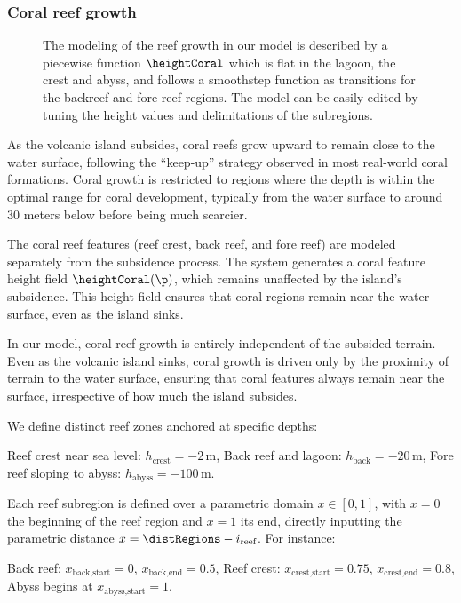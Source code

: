 \subsubsection{Coral reef growth}
\label{sec:coral-island-reef-growth}

\begin{figure}[H]
    \caption{The modeling of the reef growth in our model is described by a piecewise function $\heightCoral$ which is flat in the lagoon, the crest and abyss, and follows a smoothstep function as transitions for the backreef and fore reef regions. The model can be easily edited by tuning the height values and delimitations of the subregions. }
    \label{fig:coral-island-reef-function}
\end{figure}

As the volcanic island subsides, coral reefs grow upward to remain close to the water surface, following the “keep-up” strategy observed in most real-world coral formations. Coral growth is restricted to regions where the depth is within the optimal range for coral development, typically from the water surface to around 30 meters below before being much scarcier.

The coral reef features (reef crest, back reef, and fore reef) are modeled separately from the subsidence process. The system generates a coral feature height field $\heightCoral(\p)$, which remains unaffected by the island's subsidence. This height field ensures that coral regions remain near the water surface, even as the island sinks.

In our model, coral reef growth is entirely independent of the subsided terrain. Even as the volcanic island sinks, coral growth is driven only by the proximity of terrain to the water surface, ensuring that coral features always remain near the surface, irrespective of how much the island subsides.

We define distinct reef zones anchored at specific depths:
\begin{Itemize}
    \Item{} Reef crest near sea level: $h_\text{crest} = -2$\,m,
    \Item{} Back reef and lagoon: $h_\text{back} = -20$\,m,
    \Item{} Fore reef sloping to abyss: $h_\text{abyss} = -100$\,m.
\end{Itemize}

Each reef subregion is defined over a parametric domain $x \in [0, 1]$, with $x=0$ the beginning of the reef region and $x=1$ its end, directly inputting the parametric distance $x = \distRegions - i_{\text{reef}}$. For instance:
\begin{Itemize}
    \Item{} Back reef: $x_{\text{back,start}} = 0$, $x_{\text{back,end}} = 0.5$,
    \Item{} Reef crest: $x_{\text{crest,start}} = 0.75$, $x_{\text{crest,end}} = 0.8$,
    \Item{} Abyss begins at $x_{\text{abyss,start}} = 1$.
\end{Itemize}

